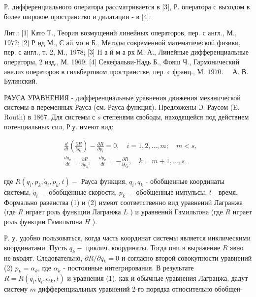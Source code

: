 \documentclass[10pt]{article}
\begin{document}
Р. дифференциального оператора рассматривается в [3], Р. оператора с выходом в более широкое пространство и дилатации - в [4].



Лит.: [1] Като Т., Теория возмущений линейных операторов, пер. с англ., М., 1972; [2] Р ид М., С ай мо н Б., Методы современной математической физики, пер. с англ., т. 2, М., 1978; [3] Н а й м а рк М. А., Линейные дифференциальные операторы, 2 изд., М. 1969; [4] Секефальви-Надь Б., Фояш Ч., Гармонический анализ операторов в гильбертовом пространстве, пер. с франц., М. $1970 . \quad$ А. В. Булинский.



РАУСА УРАВНЕНИЯ - дифференциальные уравнения движения механической системы в переменных Рауса (см. Рауса функция). Предложены Э. Раусом (E. Routh) в 1867. Для системы с $s$ степенями свободы, находящейся под действием потенциальных сил, Р.у. имеют вид:



\[

\begin{aligned}

& \frac{d}{d t}\left(\frac{\partial R}{\partial \dot{q}_{i}}\right)-\frac{\partial R}{\partial p_{i}}=0, \quad i=1,2, \ldots, m ; \quad m<s, \\

& \frac{d q_{k}}{d t}=\frac{\partial R}{\partial p_{k}}, \quad \frac{d p_{k}}{d t}=-\frac{\partial R}{\partial q_{k}}, \quad k=m+1, \ldots, s,

\end{aligned}

\]



где $R\left(q_{i}, p_{k}, \dot{q}_{i}, \dot{p}_{k}, t\right)-$ Рауса функция, $q_{i}, q_{k}$ - обобщенные координаты системы, $\dot{q}_{i}-$ обобщенные скорости, $p_{k}-$ обобщенные импульсы, $t$ - время. Формально равенства (1) и (2) имеют соответственно вид уравнений Лагранжа (где $R$ играет роль функщии Лагранжа $L$ ) и уравнений Гамильтона (где $R$ играет роль функции Гамильтона $H$ ).



Р. у. удобно пользоваться, когда часть координат системы является ииклическими координатами. Пусть $q_{k}-$ циклич. координаты. Тогда они в выражение $R$ явно не входят. Следовательно, $\partial R / \partial q_{k}=0$ и согласно второй совокупности уравнений (2) $p_{k}=\alpha_{k}$, где $\alpha_{k}$ - постоянные интегрирования. В результате $R=R\left(q_{i}, \dot{q}_{i}, \alpha_{k}, t\right)$ и уравнения (1), как и обычные уравнения Лагранжа, дадут систему $m$ дифференциальных уравнений 2-го порядка относительно обобщен-
\end{document}
